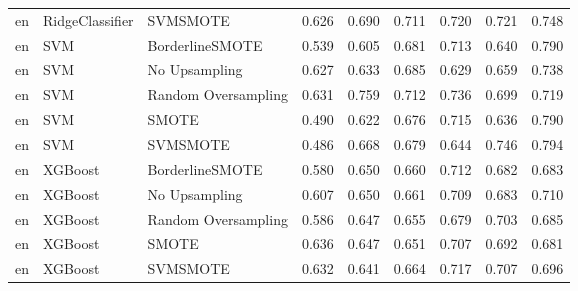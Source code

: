 \begin{tabular}{lllllllll}
      en &              RidgeClassifier &            SVMSMOTE & 0.626 &                     0.690 &                 0.711 &                  0.720 &                                   0.721 &     0.748 \\
      en &                          SVM &     BorderlineSMOTE & 0.539 &                     0.605 &                 0.681 &                  0.713 &                                   0.640 &     0.790 \\
      en &                          SVM &       No Upsampling & 0.627 &                     0.633 &                 0.685 &                  0.629 &                                   0.659 &     0.738 \\
      en &                          SVM & Random Oversampling & 0.631 &                     0.759 &                 0.712 &                  0.736 &                                   0.699 &     0.719 \\
      en &                          SVM &               SMOTE & 0.490 &                     0.622 &                 0.676 &                  0.715 &                                   0.636 &     0.790 \\
      en &                          SVM &            SVMSMOTE & 0.486 &                     0.668 &                 0.679 &                  0.644 &                                   0.746 &     0.794 \\
      en &                      XGBoost &     BorderlineSMOTE & 0.580 &                     0.650 &                 0.660 &                  0.712 &                                   0.682 &     0.683 \\
      en &                      XGBoost &       No Upsampling & 0.607 &                     0.650 &                 0.661 &                  0.709 &                                   0.683 &     0.710 \\
      en &                      XGBoost & Random Oversampling & 0.586 &                     0.647 &                 0.655 &                  0.679 &                                   0.703 &     0.685 \\
      en &                      XGBoost &               SMOTE & 0.636 &                     0.647 &                 0.651 &                  0.707 &                                   0.692 &     0.681 \\
      en &                      XGBoost &            SVMSMOTE & 0.632 &                     0.641 &                 0.664 &                  0.717 &                                   0.707 &     0.696 \\

\end{tabular}
